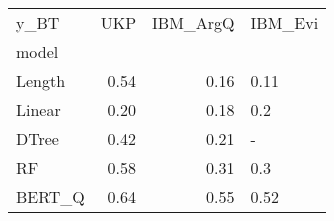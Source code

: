 \begin{tabular}{lrrl}
\toprule
y\_BT &   UKP &  IBM\_ArgQ & IBM\_Evi \\
model  &       &           &         \\
\midrule
Length &  0.54 &      0.16 &    0.11 \\
Linear &  0.20 &      0.18 &     0.2 \\
DTree  &  0.42 &      0.21 &       - \\
RF     &  0.58 &      0.31 &     0.3 \\
BERT\_Q &  0.64 &      0.55 &    0.52 \\
\bottomrule
\end{tabular}
